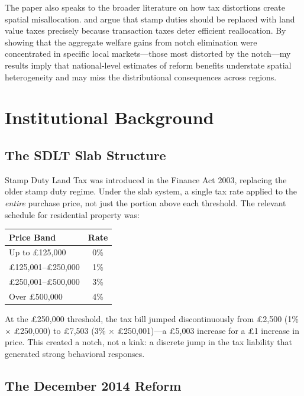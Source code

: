\documentclass[12pt]{article}
\begin{document}
The paper also speaks to the broader literature on how tax distortions create spatial misallocation. \citet{mirrlees2011} and \citet{norregaard2013} argue that stamp duties should be replaced with land value taxes precisely because transaction taxes deter efficient reallocation. By showing that the aggregate welfare gains from notch elimination were concentrated in specific local markets---those most distorted by the notch---my results imply that national-level estimates of reform benefits understate spatial heterogeneity and may miss the distributional consequences across regions.

\section{Institutional Background}

\subsection{The SDLT Slab Structure}

Stamp Duty Land Tax was introduced in the Finance Act 2003, replacing the older stamp duty regime. Under the slab system, a single tax rate applied to the \emph{entire} purchase price, not just the portion above each threshold. The relevant schedule for residential property was:

\begin{center}
\begin{tabular}{lc}
\toprule
Price Band & Rate \\
\midrule
Up to \pounds125,000 & 0\% \\
\pounds125,001--\pounds250,000 & 1\% \\
\pounds250,001--\pounds500,000 & 3\% \\
Over \pounds500,000 & 4\% \\
\bottomrule
\end{tabular}
\end{center}

At the \pounds250,000 threshold, the tax bill jumped discontinuously from \pounds2,500 (1\% $\times$ \pounds250,000) to \pounds7,503 (3\% $\times$ \pounds250,001)---a \pounds5,003 increase for a \pounds1 increase in price. This created a notch, not a kink: a discrete jump in the tax liability that generated strong behavioral responses.

\subsection{The December 2014 Reform}
\end{document}
